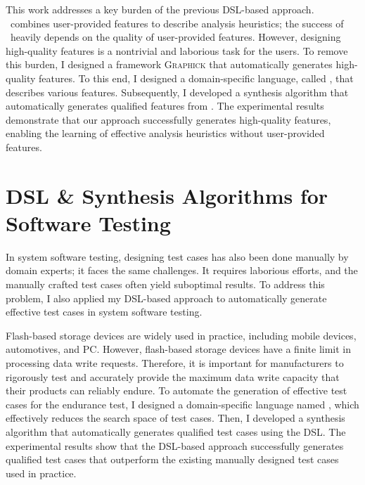 \documentclass[11pt]{article}
\newcommand{\myparagraph}[1]{\medskip\noindent{\it \textbf{#1.}}}
\begin{document}
\myparagraph{Graphick~\cite{Jeon20}}
%
This work addresses a key burden of the previous DSL-based approach. 
%
\DisjunctiveModel~combines user-provided features to describe analysis heuristics; the success of \DisjunctiveModel~heavily depends on the quality of user-provided features.
%
However, designing high-quality features is a nontrivial and laborious task for the users.
%
To remove this burden, I designed a framework \textsc{Graphick} that automatically generates high-quality features.
%
To this end, I designed a domain-specific language, called \FeatureLanguage, that describes various features.
%
Subsequently, I developed a synthesis algorithm that automatically generates qualified features from \FeatureLanguage.
%
The experimental results demonstrate that our approach successfully generates high-quality features, enabling the learning of effective analysis heuristics without user-provided features.




\section{DSL \& Synthesis Algorithms for Software Testing}
%
In system software testing, designing test cases has also been done manually by domain experts; it faces the same challenges.
It requires laborious efforts, and the manually crafted test cases often yield suboptimal results.
%
To address this problem, I also applied my DSL-based approach to automatically generate effective test cases in system software testing.




\myparagraph{ARES~\cite{ARES23}}
%
Flash-based storage devices are widely used in practice, including mobile devices, automotives, and PC. 
%
However, flash-based storage devices have a finite limit in processing data write requests.
%
Therefore, it is important for manufacturers to rigorously test and accurately provide the maximum data write capacity that their products can reliably endure.
%
To automate the generation of effective test cases for the endurance test, I designed a domain-specific language named \AbstractRelativeWritePattern, which effectively reduces the search space of test cases.
%
Then, I developed a synthesis algorithm that automatically generates qualified test cases using the DSL.
%
The experimental results show that the DSL-based approach successfully generates qualified test cases that outperform the existing manually designed test cases used in practice.
\end{document}
